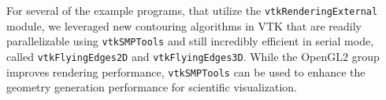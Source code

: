 For several of the example programs, that utilize the \texttt{vtkRenderingExternal} module, we leveraged new contouring algorithms in VTK that are readily parallelizable using \texttt{vtkSMPTools} and still incredibly efficient in serial mode, called \texttt{vtkFlyingEdges2D} and \texttt{vtkFlyingEdges3D}.
While the OpenGL2 group improves rendering performance, \texttt{vtkSMPTools} can be used to enhance the geometry generation performance for scientific visualization.
